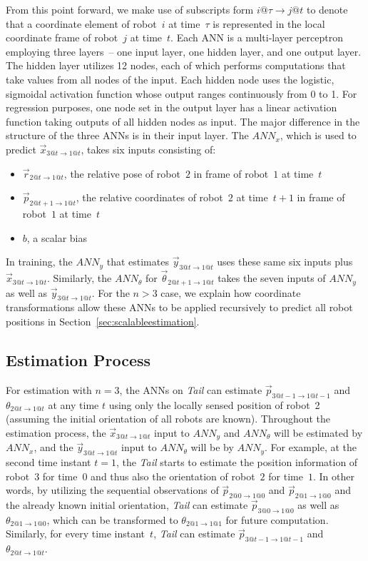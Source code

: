 \documentclass[letterpaper, 10 pt, conference]{ieeeconf}  %
\begin{document}
	From this point forward, we make use of subscripts form $i@\tau\to j@t$
	to denote that a coordinate element of robot~$i$ at time~$\tau$ is
	represented in the local coordinate frame of robot~$j$ at time~$t$. Each
	ANN is a multi-layer perceptron employing three layers~-- one input
	layer, one hidden layer, and one output layer. The hidden layer utilizes
	12 nodes, each of which performs computations that take values from all
	nodes of the input. Each hidden node uses the logistic, sigmoidal
	activation function whose output ranges continuously from 0 to 1. For
	regression purposes, one node set in the output layer has a linear
	activation function taking outputs of all hidden nodes as input. The
	major difference in the structure of the three ANNs is in their input
	layer. The $ANN_{x}$, which is used to predict $\vec{x}_{3@t\to 1@t}$,
	takes six inputs consisting of:
	\begin{itemize}
		\item $\vec{r}_{2@t\to 1@t}$, the relative pose of robot~$2$ in frame
		of robot~$1$ at time~$t$
		
		\item $\vec{p}_{2@t+1\to 1@t}$, the relative coordinates of robot~$2$
		at time~$t+1$ in frame of robot~$1$ at time~$t$
		
		\item $b$, a scalar bias
	\end{itemize}
	In training, the $ANN_{y}$ that estimates $\vec{y}_{3@t\to 1@t}$ uses
	these same six inputs plus $\vec{x}_{3@t\to 1@t}$. Similarly, the
	$ANN_{\theta}$ for $\vec{\theta}_{2@t+1\to 1@t}$ takes the seven inputs
	of $ANN_{y}$ as well as $\vec{y}_{3@t\to 1@t}$. For the $n > 3$ case, we
	explain how coordinate transformations allow these ANNs to be applied
	recursively to predict all robot positions in
	Section~\ref{sec:scalableestimation}.
	
	\subsection{Estimation Process}
	\label{sec:estimationprocess}
	
	For estimation with $n=3$, the ANNs on \emph{Tail} can estimate
	$\vec{p}_{3@t-1\to 1@t-1}$ and $\theta_{2@t\to 1@t}$ at any time $t$
	using only the locally sensed position of robot~2 (assuming the initial
	orientation of all robots are known). Throughout the estimation process,
	the $\vec{x}_{3@t\to 1@t}$ input to $ANN_{y}$ and $ANN_{\theta}$ will be
	estimated by $ANN_{x}$, and the $\vec{y}_{3@t\to 1@t}$ input to
	$ANN_{\theta}$ will be by $ANN_{y}$. For example, at the second time
	instant $t=1$, the \emph{Tail} starts to estimate the position
	information of robot~$3$ for time~$0$ and thus also the orientation of
	robot~$2$ for time~$1$. In other words, by utilizing the sequential
	observations of $\vec{p}_{2@0\to 1@0}$ and $\vec{p}_{2@1\to 1@0}$ and
	the already known initial orientation, \emph{Tail} can estimate
	$\vec{p}_{3@0\to 1@0}$ as well as $\theta_{2@1\to 1@0}$, which can be
	transformed to $\theta_{2@1\to 1@1}$ for future computation. Similarly,
	for every time instant~$t$, \emph{Tail} can estimate $\vec{p}_{3@t-1\to
		1@t-1}$ and $\theta_{2@t\to 1@t}$.
	
\end{document}
